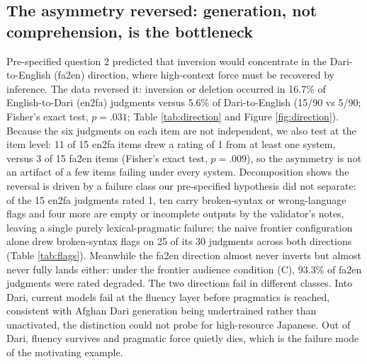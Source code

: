 \documentclass[11pt]{article}
\begin{document}
\subsection{The asymmetry reversed: generation, not comprehension, is the bottleneck}
\label{sec:direction}
Pre-specified question 2 predicted that inversion would concentrate in the Dari-to-English (fa2en) direction, where high-context force must be recovered by inference. The data reversed it: inversion or deletion occurred in 16.7\% of English-to-Dari (en2fa) judgments versus 5.6\% of Dari-to-English (15/90 vs 5/90; Fisher's exact test, $p=.031$; Table \ref{tab:direction} and Figure \ref{fig:direction}). Because the six judgments on each item are not independent, we also test at the item level: 11 of 15 en2fa items drew a rating of 1 from at least one system, versus 3 of 15 fa2en items (Fisher's exact test, $p=.009$), so the asymmetry is not an artifact of a few items failing under every system. Decomposition shows the reversal is driven by a failure class our pre-specified hypothesis did not separate: of the 15 en2fa judgments rated 1, ten carry broken-syntax or wrong-language flags and four more are empty or incomplete outputs by the validator's notes, leaving a single purely lexical-pragmatic failure; the naive frontier configuration alone drew broken-syntax flags on 25 of its 30 judgments across both directions (Table \ref{tab:flags}). Meanwhile the fa2en direction almost never inverts but almost never fully lands either: under the frontier audience condition (C), 93.3\% of fa2en judgments were rated degraded. The two directions fail in different classes. Into Dari, current models fail at the fluency layer before pragmatics is reached, consistent with Afghan Dari generation being undertrained rather than unactivated, the distinction \citet{tenzer2026pragmatics} could not probe for high-resource Japanese. Out of Dari, fluency survives and pragmatic force quietly dies, which is the failure mode of the motivating example.
\end{document}
